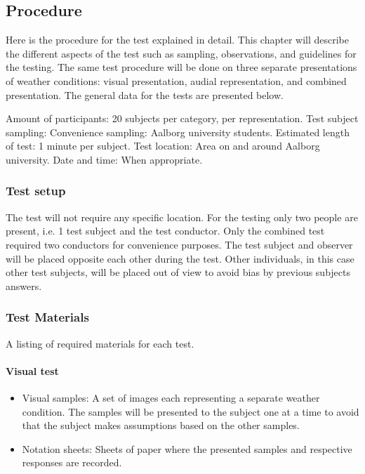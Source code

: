 \subsection{Procedure} %
\label{sub:procedure}

Here is the procedure for the test explained in detail. 
This chapter will describe the different aspects of the test such as sampling, observations, and guidelines for the testing. 
The same test procedure will be done on three separate presentations of weather conditions: visual presentation, audial representation, and combined presentation.
The general data for the tests are presented below.

Amount of participants: 20 subjects per category, per representation.
Test subject sampling: Convenience sampling: Aalborg university students.
Estimated length of test: 1 minute per subject.
Test location: Area on and around Aalborg university.
Date and time: When appropriate.


\subsubsection{Test setup} %
\label{ssub:test_setup}

The test will not require any specific location. 
For the testing only two people are present, i.e. 1 test subject and the test conductor. 
Only the combined test required two conductors for convenience purposes. 
The test subject and observer will be placed opposite each other during the test.
Other individuals, in this case other test subjects, will be placed out of view to avoid bias by previous subjects answers. 



\subsubsection*{Test Materials} %
\label{ssub:test_materials}
A listing of required materials for each test.

\paragraph{Visual test} %
\label{par:visual_test}

\begin{itemize}
    \item Visual samples: A set of images each representing a separate weather condition. The samples will be presented to the subject one at a time to avoid that the subject makes assumptions based on the other samples. 
    \item Notation sheets: Sheets of paper where the presented samples and respective responses are recorded.
\end{itemize}

